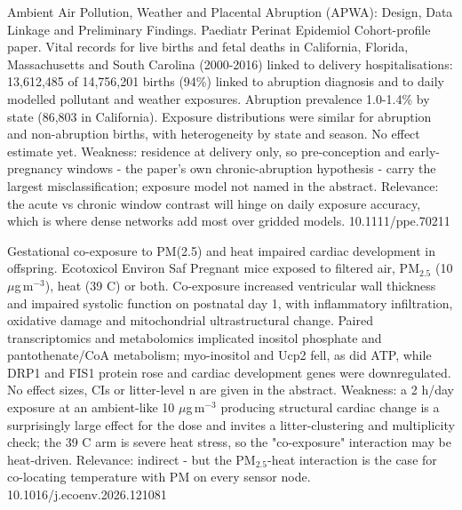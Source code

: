\documentclass[10pt]{article}
\begin{document}
\par{}\baselineskip{}\baselineskip
{}

{Ambient Air Pollution, Weather and Placental Abruption (APWA): Design, Data Linkage and Preliminary Findings.}
{Paediatr Perinat Epidemiol}
{Cohort-profile paper. Vital records for live births and fetal deaths in California, Florida, Massachusetts and South Carolina (2000-2016) linked to delivery hospitalisations: 13,612,485 of 14,756,201 births (94\%) linked to abruption diagnosis and to daily modelled pollutant and weather exposures. Abruption prevalence 1.0-1.4\% by state (86,803 in California). Exposure distributions were similar for abruption and non-abruption births, with heterogeneity by state and season. No effect estimate yet. Weakness: residence at delivery only, so pre-conception and early-pregnancy windows - the paper's own chronic-abruption hypothesis - carry the largest misclassification; exposure model not named in the abstract. Relevance: the acute vs chronic window contrast will hinge on daily exposure accuracy, which is where dense networks add most over gridded models.}
{10.1111/ppe.70211}

{Gestational co-exposure to PM(2.5) and heat impaired cardiac development in offspring.}
{Ecotoxicol Environ Saf}
{Pregnant mice exposed to filtered air, PM$_{2.5}$ (10 $\mu$g\,m$^{-3}$), heat (39 C) or both. Co-exposure increased ventricular wall thickness and impaired systolic function on postnatal day 1, with inflammatory infiltration, oxidative damage and mitochondrial ultrastructural change. Paired transcriptomics and metabolomics implicated inositol phosphate and pantothenate/CoA metabolism; myo-inositol and Ucp2 fell, as did ATP, while DRP1 and FIS1 protein rose and cardiac development genes were downregulated. No effect sizes, CIs or litter-level n are given in the abstract. Weakness: a 2 h/day exposure at an ambient-like 10 $\mu$g\,m$^{-3}$ producing structural cardiac change is a surprisingly large effect for the dose and invites a litter-clustering and multiplicity check; the 39 C arm is severe heat stress, so the "co-exposure" interaction may be heat-driven. Relevance: indirect - but the PM$_{2.5}$-heat interaction is the case for co-locating temperature with PM on every sensor node.}
{10.1016/j.ecoenv.2026.121081}
\end{document}
